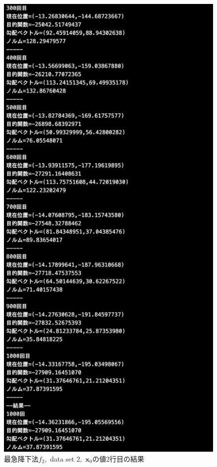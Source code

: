 \documentclass[12pt]{jarticle}
\begin{document}
\begin{figure}[h]
\begin{minipage}{0.5\hsize}
    \end{minipage}
    \begin{minipage}{0.5\hsize}
        \begin{center}
            \includegraphics[scale=0.2]{kadai1_2s_out2_2_3.png}
        \end{center}
    \end{minipage}
    \caption{最急降下法$f_2$,\ data set 2,\ $\boldsymbol{x}_0$の値2行目の結果}
\end{figure}
\end{document}
